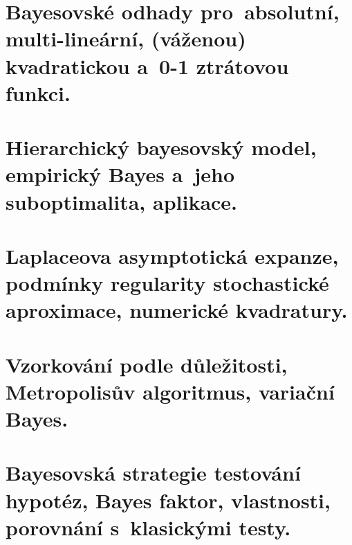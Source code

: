 \chapter{Bayesovské odhady pro~absolutní, multi-lineární, (váženou) kvadratickou a~0-1 ztrátovou funkci.}


\chapter{Hierarchický bayesovský model, empirický Bayes a~jeho suboptimalita, aplikace.}


\chapter{Laplaceova asymptotická expanze, podmínky regularity stochastické aproximace, numerické kvadratury.}


\chapter{Vzorkování podle důležitosti, Metropolisův algoritmus, variační Bayes.}


\chapter{Bayesovská strategie testování hypotéz, Bayes faktor, vlastnosti, porovnání s~klasickými testy.}


